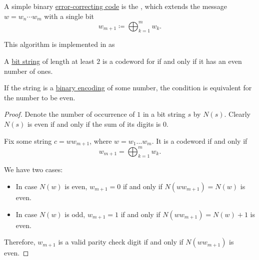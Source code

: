 \begin{algorithm}\label{alg:parity_check_code}
  A simple binary \hyperref[def:error_correcting_code]{error-correcting code} is the , which extends the message \( w = w_n \cdots w_m \) with a single bit
  \begin{equation*}
    w_{m+1} \coloneqq \bigoplus_{k=1}^m w_k.
  \end{equation*}
\end{algorithm}
\begin{comments}
  \item This algorithm is implemented in \cite{notebook:code} as
  \begin{CodeRefDisplay}
  \end{CodeRefDisplay}
\end{comments}

\begin{proposition}\label{thm:parity_check_codeword_characterization}
  A \hyperref[def:bit_string]{bit string} of length at least \( 2 \) is a codeword for  if and only if it has an even number of ones.
\end{proposition}
\begin{comments}
  \item If the string is a \hyperref[def:ring_of_unsigned_integers]{binary encoding} of some number, the condition is equivalent for the number to be even.
\end{comments}
\begin{proof}
  Denote the number of occurrence of \( 1 \) in a bit string \( s \) by \( N(s) \). Clearly \( N(s) \) is even if and only if the sum of its digits is \( 0 \).

  Fix some string \( c = w w_{m+1} \), where \( w = w_1 \ldots w_m \). It is a codeword if and only if
  \begin{equation*}
    w_{m+1} = \bigoplus_{k=1}^m w_k.
  \end{equation*}

  We have two cases:
  \begin{itemize}
    \item In case \( N(w) \) is even, \( w_{m+1} = 0 \) if and only if \( N(w w_{m+1}) = N(w) \) is even.
    \item In case \( N(w) \) is odd, \( w_{m+1} = 1 \) if and only if \( N(w w_{m+1}) = N(w) + 1 \) is even.
  \end{itemize}

  Therefore, \( w_{m+1} \) is a valid parity check digit if and only if \( N(w w_{m+1}) \) is even.
\end{proof}

